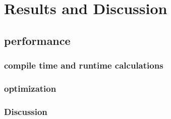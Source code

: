 
\chapter{Results and Discussion}

\section{performance}

\subsection{compile time and runtime calculations}

\subsection{optimization}

\subsection{Discussion}
\cleardoublepage